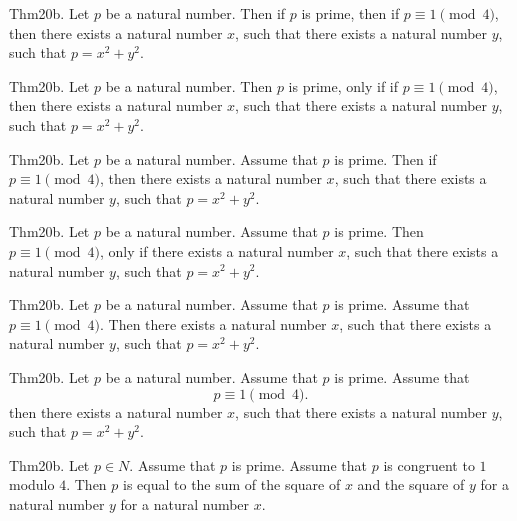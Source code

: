 \documentclass{article}
\begin{document}
Thm20b. Let $p$ be a natural number. Then if $p$ is prime, then if $p \equiv 1 \pmod{ 4}$, then there exists a natural number $x$, such that there exists a natural number $y$, such that $p = x ^{ 2}+ y ^{ 2}$.

Thm20b. Let $p$ be a natural number. Then $p$ is prime, only if if $p \equiv 1 \pmod{ 4}$, then there exists a natural number $x$, such that there exists a natural number $y$, such that $p = x ^{ 2}+ y ^{ 2}$.

Thm20b. Let $p$ be a natural number. Assume that $p$ is prime. Then if $p \equiv 1 \pmod{ 4}$, then there exists a natural number $x$, such that there exists a natural number $y$, such that $p = x ^{ 2}+ y ^{ 2}$.

Thm20b. Let $p$ be a natural number. Assume that $p$ is prime. Then $p \equiv 1 \pmod{ 4}$, only if there exists a natural number $x$, such that there exists a natural number $y$, such that $p = x ^{ 2}+ y ^{ 2}$.

Thm20b. Let $p$ be a natural number. Assume that $p$ is prime. Assume that $p \equiv 1 \pmod{ 4}$. Then there exists a natural number $x$, such that there exists a natural number $y$, such that $p = x ^{ 2}+ y ^{ 2}$.

Thm20b. Let $p$ be a natural number. Assume that $p$ is prime. Assume that $$p \equiv 1 \pmod{ 4}.$$ then there exists a natural number $x$, such that there exists a natural number $y$, such that $p = x ^{ 2}+ y ^{ 2}$.

Thm20b. Let $p \in N$. Assume that $p$ is prime. Assume that $p$ is congruent to $1$ modulo $4$. Then $p$ is equal to the sum of the square of $x$ and the square of $y$ for a natural number $y$ for a natural number $x$.
\end{document}
